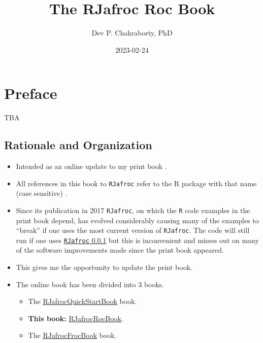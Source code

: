 \documentclass[
]{book}
\title{The RJafroc Roc Book}
\author{Dev P. Chakraborty, PhD}
\date{2023-02-24}
\providecommand{\tightlist}{%
  \setlength{\itemsep}{0pt}\setlength{\parskip}{0pt}}
\begin{document}
\maketitle

{
\setcounter{tocdepth}{1}
\tableofcontents
}
\hypertarget{preface}{%
\chapter*{Preface}\label{preface}}

TBA

\hypertarget{rationale-and-organization}{%
\section{Rationale and Organization}\label{rationale-and-organization}}

\begin{itemize}
\tightlist
\item
  Intended as an online update to my print book \citep{chakraborty2017observer}.
\item
  All references in this book to \texttt{RJafroc} refer to the R package with that name (case sensitive) \citep{R-RJafroc}.
\item
  Since its publication in 2017 \texttt{RJafroc}, on which the \texttt{R} code examples in the print book depend, has evolved considerably causing many of the examples to ``break'' if one uses the most current version of \texttt{RJafroc}. The code will still run if one uses \href{https://cran.r-project.org/src/contrib/Archive/RJafroc/}{\texttt{RJafroc} 0.0.1} but this is inconvenient and misses out on many of the software improvements made since the print book appeared.
\item
  This gives me the opportunity to update the print book.
\item
  The online book has been divided into 3 books.

  \begin{itemize}
  \tightlist
  \item
    The \href{https://dpc10ster.github.io/RJafrocQuickStart/}{RJafrocQuickStartBook} book.
  \item
    \textbf{This book:} \href{https://dpc10ster.github.io/RJafrocRocBook/}{RJafrocRocBook}.
  \item
    The \href{https://dpc10ster.github.io/RJafrocFrocBook/}{RJafrocFrocBook} book.
  \end{itemize}
\end{itemize}
\end{document}
